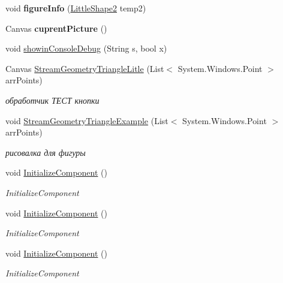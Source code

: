 \begin{DoxyCompactItemize}
\item 
\hypertarget{classtwelve_1_1_main_window_a829c67c5bd13de56ee264abf658762dc}{}void {\bfseries figure\+Info} (\hyperlink{classtwelve_1_1_little_shape2}{Little\+Shape2} temp2)\label{classtwelve_1_1_main_window_a829c67c5bd13de56ee264abf658762dc}

\item 
\hypertarget{classtwelve_1_1_main_window_a0da87738c75f6d89f0d03070474543fe}{}Canvas {\bfseries cuprent\+Picture} ()\label{classtwelve_1_1_main_window_a0da87738c75f6d89f0d03070474543fe}

\item 
void \hyperlink{classtwelve_1_1_main_window_aedcedf38ae172b730e9b86fd91b8bb75}{showin\+Console\+Debug} (String s, bool x)
\item 
Canvas \hyperlink{classtwelve_1_1_main_window_a5fe1ea86efca790d66e7c803dec7a666}{Stream\+Geometry\+Triangle\+Litle} (List$<$ System.\+Windows.\+Point $>$ arr\+Points)
\begin{DoxyCompactList}\small\item\em обработчик ТЕСТ кнопки \end{DoxyCompactList}\item 
void \hyperlink{classtwelve_1_1_main_window_a8b4ddfee953ce2787f242eaaaefaa26c}{Stream\+Geometry\+Triangle\+Example} (List$<$ System.\+Windows.\+Point $>$ arr\+Points)
\begin{DoxyCompactList}\small\item\em рисовалка для фигуры \end{DoxyCompactList}\item 
void \hyperlink{classtwelve_1_1_main_window_a3b53f5fa36890e3451372782b73b54d1}{Initialize\+Component} ()
\begin{DoxyCompactList}\small\item\em Initialize\+Component \end{DoxyCompactList}\item 
void \hyperlink{classtwelve_1_1_main_window_a3b53f5fa36890e3451372782b73b54d1}{Initialize\+Component} ()
\begin{DoxyCompactList}\small\item\em Initialize\+Component \end{DoxyCompactList}\item 
void \hyperlink{classtwelve_1_1_main_window_a3b53f5fa36890e3451372782b73b54d1}{Initialize\+Component} ()
\begin{DoxyCompactList}\small\item\em Initialize\+Component \end{DoxyCompactList}\item 

\end{DoxyCompactItemize}
